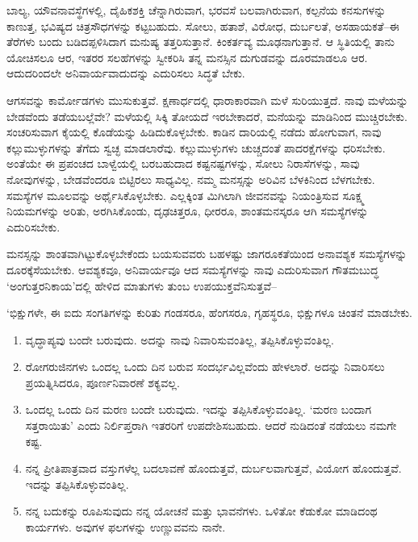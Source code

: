 ಬಾಲ್ಯ, ಯೌವನಾವಸ್ಥೆಗಳಲ್ಲಿ, ದೈಹಿಕಶಕ್ತಿ ಚೆನ್ನಾಗಿರುವಾಗ, ಭರವಸೆ ಬಲವಾಗಿರುವಾಗ, ಕಲ್ಪನೆಯ ಕನಸುಗಳನ್ನು ಕಾಣುತ್ತ, ಭವಿಷ್ಯದ ಚಿತ್ರಸೌಧಗಳನ್ನು ಕಟ್ಟಬಹುದು. ಸೋಲು, ಹತಾಶೆ, ವಿರೋಧ, ದುರ್ಬಲತೆ, ಅಸಹಾಯಕತೆ–ಈ ತೆರೆಗಳು ಬಂದು ಬಡಿದಪ್ಪಳಿಸಿದಾಗ ಮನುಷ್ಯ ತತ್ತರಿಸುತ್ತಾನೆ. ಕಿಂಕರ್ತವ್ಯ ಮೂಢನಾಗುತ್ತಾನೆ. ಆ ಸ್ಥಿತಿಯಲ್ಲಿ ತಾನು ಯೋಚಿಸಲೂ ಆರ, ಇತರರ ಸಲಹೆಗಳನ್ನು ಸ್ವೀಕರಿಸಿ ತನ್ನ ಮನಸ್ಸಿನ ದುಗುಡವನ್ನು ದೂರಮಾಡಲೂ ಆರ. ಆದುದರಿಂದಲೇ ಅನಿವಾರ್ಯವಾದುದನ್ನು ಎದುರಿಸಲು ಸಿದ್ಧತೆ ಬೇಕು.

ಆಗಸವನ್ನು ಕಾರ್ಮೋಡಗಳು ಮುಸುಕುತ್ತವೆ. ಕ್ಷಣಾರ್ಧದಲ್ಲಿ ಧಾರಾಕಾರವಾಗಿ ಮಳೆ ಸುರಿಯುತ್ತದೆ. ನಾವು ಮಳೆಯನ್ನು ಬೇಡವೆಂದು ತಡೆಯಬಲ್ಲೆವೇ? ಮಳೆಯಲ್ಲಿ ಸಿಕ್ಕಿ ತೋಯದೆ ಇರಬೇಕಾದರೆ, ಮನೆಯನ್ನು ಮಾಡಿನಿಂದ ಮುಚ್ಚಿರಬೇಕು. ಸಂಚರಿಸುವಾಗ ಕೈಯಲ್ಲಿ ಕೊಡೆಯನ್ನು ಹಿಡಿದುಕೊಳ್ಳಬೇಕು. ಕಾಡಿನ ದಾರಿಯಲ್ಲಿ ನಡೆದು ಹೋಗುವಾಗ, ನಾವು ಕಲ್ಲುಮುಳ್ಳುಗಳನ್ನು ತೆಗೆದು ಸ್ವಚ್ಛ ಮಾಡಲಾರೆವು. ಕಲ್ಲುಮುಳ್ಳುಗಳು ಚುಚ್ಚದಂತೆ ಪಾದರಕ್ಷೆಗಳನ್ನು ಧರಿಸಬೇಕು. ಅಂತೆಯೇ ಈ ಪ್ರಪಂಚದ ಬಾಳ್ವೆಯಲ್ಲಿ ಬರಬಹುದಾದ ಕಷ್ಟನಷ್ಟಗಳನ್ನು, ಸೋಲು ನಿರಾಸೆಗಳನ್ನು, ಸಾವು ನೋವುಗಳನ್ನು, ಬೇಡವೆಂದರೂ ಬಿಟ್ಟಿರಲು ಸಾಧ್ಯವಿಲ್ಲ. ನಮ್ಮ ಮನಸ್ಸನ್ನು ಅರಿವಿನ ಬೆಳಕಿನಿಂದ ಬೆಳಗಬೇಕು. ಸಮಸ್ಯೆಗಳ ಮೂಲವನ್ನು ಅರ್ಥೈಸಿಕೊಳ್ಳಬೇಕು. ಎಲ್ಲಕ್ಕಿಂತ ಮಿಗಿಲಾಗಿ ಜೀವನವನ್ನು ನಿಯಂತ್ರಿಸುವ ಸೂಕ್ಷ್ಮ ನಿಯಮಗಳನ್ನು ಅರಿತು, ಅರಗಿಸಿಕೊಂಡು, ದೃಢಚಿತ್ತರೂ, ಧೀರರೂ, ಶಾಂತಮನಸ್ಕರೂ ಆಗಿ ಸಮಸ್ಯೆಗಳನ್ನು ಎದುರಿಸಬೇಕು.

ಮನಸ್ಸನ್ನು ಶಾಂತವಾಗಿಟ್ಟುಕೊಳ್ಳಬೇಕೆಂದು ಬಯಸುವವರು ಬಹಳಷ್ಟು ಜಾಗರೂಕತೆಯಿಂದ ಅನಾವಶ್ಯಕ ಸಮಸ್ಯೆಗಳನ್ನು ದೂರಕ್ಕೆಸೆಯಬೇಕು. ಆವಶ್ಯಕವೂ, ಅನಿವಾರ್ಯವೂ ಆದ ಸಮಸ್ಯೆಗಳನ್ನು ನಾವು ಎದುರಿಸುವಾಗ ಗೌತಮಬುದ್ಧ ‘ಅಂಗುತ್ತರನಿಕಾಯ’ದಲ್ಲಿ ಹೇಳಿದ ಮಾತುಗಳು ತುಂಬ ಉಪಯುಕ್ತವೆನಿಸುತ್ತವೆ–

‘ಭಿಕ್ಷುಗಳೇ, ಈ ಐದು ಸಂಗತಿಗಳನ್ನು ಕುರಿತು ಗಂಡಸರೂ, ಹೆಂಗಸರೂ, ಗೃಹಸ್ಥರೂ, ಭಿಕ್ಷುಗಳೂ ಚಿಂತನೆ ಮಾಡಬೇಕು.

\begin{enumerate}
\item ವೃದ್ಧಾಪ್ಯವು ಬಂದೇ ಬರುವುದು. ಅದನ್ನು ನಾವು ನಿವಾರಿಸುವಂತಿಲ್ಲ, ತಪ್ಪಿಸಿಕೊಳ್ಳು\-ವಂತಿಲ್ಲ.

 \item ರೋಗರುಜಿನಗಳು ಒಂದಲ್ಲ ಒಂದು ದಿನ ಬರುವ ಸಂದರ್ಭವಿಲ್ಲವೆಂದು ಹೇಳಲಾರೆ. ಅದನ್ನು ನಿವಾರಿಸಲು ಪ್ರಯತ್ನಿಸಿದರೂ, ಪೂರ್ಣನಿವಾರಣೆ ಶಕ್ಯವಲ್ಲ.

 \item ಒಂದಲ್ಲ ಒಂದು ದಿನ ಮರಣ ಬಂದೇ ಬರುವುದು. ಇದನ್ನು ತಪ್ಪಿಸಿಕೊಳ್ಳು\-ವಂತಿಲ್ಲ. ‘ಮರಣ ಬಂದಾಗ ಸತ್ತರಾಯಿತು’ ಎಂದು ನಿರ್ಲಿಪ್ತರಾಗಿ ಇತರರಿಗೆ ಉಪದೇಶಿಸ\-\break ಬಹುದು. ಆದರೆ ನುಡಿದಂತೆ ನಡೆಯಲು ನಮಗೇ ಕಷ್ಟ.

 \item ನನ್ನ ಪ್ರೀತಿಪಾತ್ರವಾದ ವಸ್ತುಗಳೆಲ್ಲ ಬದಲಾವಣೆ ಹೊಂದುತ್ತವೆ, ದುರ್ಬಲವಾಗುತ್ತವೆ, ವಿಯೋಗ ಹೊಂದುತ್ತವೆ. ಇದನ್ನು ತಪ್ಪಿಸಿಕೊಳ್ಳುವಂತಿಲ್ಲ.

 \item ನನ್ನ ಬದುಕನ್ನು ರೂಪಿಸುವುದು ನನ್ನ ಯೋಚನೆ ಮತ್ತು ಭಾವನೆಗಳು. ಒಳಿತೋ ಕೆಡುಕೋ ಮಾಡಿದಂಥ ಕಾರ್ಯಗಳು. ಅವುಗಳ ಫಲಗಳನ್ನು ಉಣ್ಣುವವನು ನಾನೇ.

\end{enumerate}

